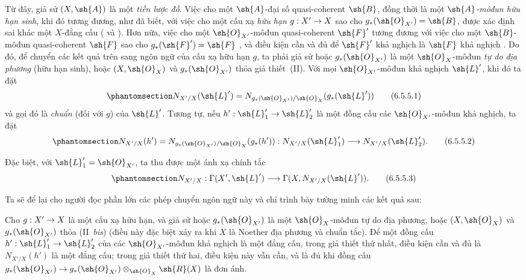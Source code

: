 \documentclass[oneside,10pt]{amsart}
\makeatletter
\newcommand{\ega@arrow}[2]{\mathchoice{#1}{#2}{#2}{#2}}
\renewcommand{\to}{\ega@arrow{\longrightarrow}{\rightarrow}}
\let\EGAOriginalLabel\label
\renewcommand{\label}[1]{\phantomsection\EGAOriginalLabel{#1}}
\makeatother
\begin{document}
\begin{env}[6.5.5]
\label{II.6.5.5}
Từ đây, giả sử $(X,\sh{A})$ là một \emph{tiền lược đồ}.
Việc cho một $\sh{A}$-đại số quasi-coherent $\sh{B}$, đồng thời là một \emph{$\sh{A}$-môđun hữu hạn sinh}, khi đó tương đương, như đã biết, với việc cho một cấu xạ \emph{hữu hạn} $g:X'\to X$ sao cho $g_*(\sh{O}_{X'})=\sh{B}$, được xác định sai khác một $X$-đẳng cấu ( và ).
Hơn nữa, việc cho một $\sh{O}_{X'}$-môđun quasi-coherent $\sh{F}'$ tương đương với việc cho một $\sh{B}$-môđun quasi-coherent $\sh{F}$ sao cho $g_*(\sh{F}')=\sh{F}$ , và điều kiện cần và đủ để $\sh{F}'$ khả nghịch là $\sh{F}$ khả nghịch .
Do đó, để chuyển các kết quả trên sang ngôn ngữ của cấu xạ hữu hạn $g$, ta phải giả sử hoặc $g_*(\sh{O}_{X'})$ là một $\sh{O}_X$-môđun \emph{tự do địa phương} (hữu hạn sinh), hoặc $(X,\sh{O}_X)$ và $g_*(\sh{O}_{X'})$ thỏa giả thiết~(II).
Với mọi $\sh{O}_{X'}$-môđun khả nghịch $\sh{L}'$, khi đó ta đặt
\[
\label{II.6.5.5.1}
  N_{X'/X}(\sh{L}') = N_{g_*(\sh{O}_{X'})/\sh{O}_X}(g_*(\sh{L}'))
\tag{6.5.5.1}
\]
và gọi đó là \emph{chuẩn} (đối với $g$) của $\sh{L}'$.
Tương tự, nếu $h':\sh{L}'_1\to\sh{L}'_2$ là một đồng cấu các $\sh{O}_{X'}$-môđun khả nghịch, ta đặt
\[
\label{II.6.5.5.2}
  N_{X'/X}(h') = N_{g_*(\sh{O}_{X'})/\sh{O}_X}(g_*(h')) : N_{X'/X}(\sh{L}'_1)\to N_{X'/X}(\sh{L}'_2).
\tag{6.5.5.2}
\]

Đặc biệt, với $\sh{L}'_1=\sh{O}_{X'}$, ta thu được một ánh xạ chính tắc
\[
\label{II.6.5.5.3}
  N_{X'/X} : \Gamma(X',\sh{L}') \to \Gamma(X,N_{X'/X}(\sh{L}')).
\tag{6.5.5.3}
\]

Ta sẽ để lại cho người đọc phần lớn các phép chuyển ngôn ngữ này và chỉ trình bày tường minh các kết quả sau:
\end{env}

\begin{proposition}[6.5.6]
\label{II.6.5.6}
Cho $g:X'\to X$ là một cấu xạ hữu hạn, và giả sử hoặc $g_*(\sh{O}_{X'})$ là một $\sh{O}_X$-môđun tự do địa phương, hoặc $(X,\sh{O}_X)$ và $g_*(\sh{O}_{X'})$ thỏa (II~\emph{bis}) (điều này đặc biệt xảy ra khi $X$ là Noether địa phương và chuẩn tắc).
Để một đồng cấu $h':\sh{L}'_1\to\sh{L}'_2$ của các $\sh{O}_{X'}$-môđun khả nghịch là một đẳng cấu, trong giả thiết thứ nhất, điều kiện cần và đủ là $N_{X'/X}(h')$ là một đẳng cấu;
trong giả thiết thứ hai, điều kiện này vẫn cần, và là đủ khi đồng cấu $g_*(\sh{O}_{X'})\to g_*(\sh{O}_{X'})\otimes_{\sh{O}_X}\sh{R}(X)$ là đơn ánh.
\end{proposition}
\end{document}
